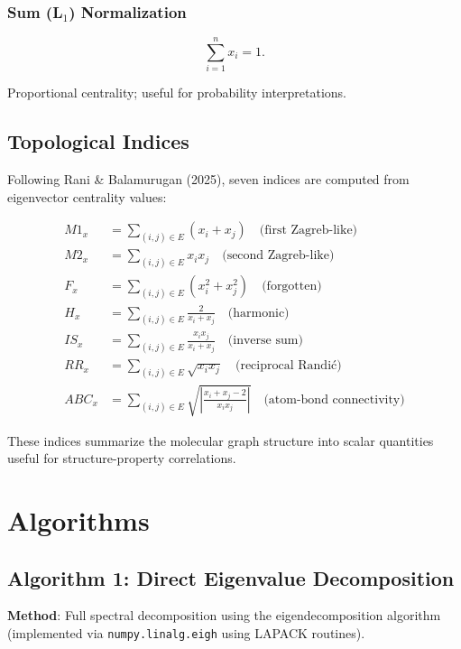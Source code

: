 \documentclass[12pt]{article}
\begin{document}
\subsubsection{Sum (L$_1$) Normalization}

\[
\sum_{i=1}^{n} x_i = 1.
\]

Proportional centrality; useful for probability interpretations.

\subsection{Topological Indices}

Following Rani \& Balamurugan (2025), seven indices are computed from eigenvector centrality values:

\begin{align*}
M1_x &= \sum_{(i,j)\in E} (x_i + x_j) \quad \text{(first Zagreb-like)} \\
M2_x &= \sum_{(i,j)\in E} x_i x_j \quad \text{(second Zagreb-like)} \\
F_x  &= \sum_{(i,j)\in E} (x_i^2 + x_j^2) \quad \text{(forgotten)} \\
H_x  &= \sum_{(i,j)\in E} \frac{2}{x_i + x_j} \quad \text{(harmonic)} \\
IS_x &= \sum_{(i,j)\in E} \frac{x_i x_j}{x_i + x_j} \quad \text{(inverse sum)} \\
RR_x &= \sum_{(i,j)\in E} \sqrt{x_i x_j} \quad \text{(reciprocal Randić)} \\
ABC_x &= \sum_{(i,j)\in E} \sqrt{\left|\frac{x_i + x_j - 2}{x_i x_j}\right|} \quad \text{(atom-bond connectivity)}
\end{align*}

These indices summarize the molecular graph structure into scalar quantities useful for structure-property correlations.

\section{Algorithms}

\subsection{Algorithm 1: Direct Eigenvalue Decomposition}

\textbf{Method}: Full spectral decomposition using the eigendecomposition algorithm (implemented via \texttt{numpy.linalg.eigh} using LAPACK routines).
\end{document}
